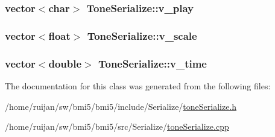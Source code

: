 \hypertarget{classToneSerialize_a9313ff97557d382476944defa90f6a8e}{
\subsubsection[{v\-\_\-play}]{\setlength{\rightskip}{0pt plus 5cm}vector$<$char$>$ Tone\-Serialize\-::v\-\_\-play\hspace{0.3cm}{\ttfamily [private]}}}\label{classToneSerialize_a9313ff97557d382476944defa90f6a8e}
\hypertarget{classToneSerialize_ab6e8afad24a81b6dcfc3c6970fe289eb}{
\subsubsection[{v\-\_\-scale}]{\setlength{\rightskip}{0pt plus 5cm}vector$<$float$>$ Tone\-Serialize\-::v\-\_\-scale\hspace{0.3cm}{\ttfamily [private]}}}\label{classToneSerialize_ab6e8afad24a81b6dcfc3c6970fe289eb}
\hypertarget{classToneSerialize_a2b10ad240255d0094337d0c3078e5e10}{
\subsubsection[{v\-\_\-time}]{\setlength{\rightskip}{0pt plus 5cm}vector$<$double$>$ Tone\-Serialize\-::v\-\_\-time\hspace{0.3cm}{\ttfamily [private]}}}\label{classToneSerialize_a2b10ad240255d0094337d0c3078e5e10}


The documentation for this class was generated from the following files\-:\begin{DoxyCompactItemize}
\item 
/home/ruijan/sw/bmi5/bmi5/include/\-Serialize/\hyperlink{toneSerialize_8h}{tone\-Serialize.\-h}\item 
/home/ruijan/sw/bmi5/bmi5/src/\-Serialize/\hyperlink{toneSerialize_8cpp}{tone\-Serialize.\-cpp}\end{DoxyCompactItemize}
